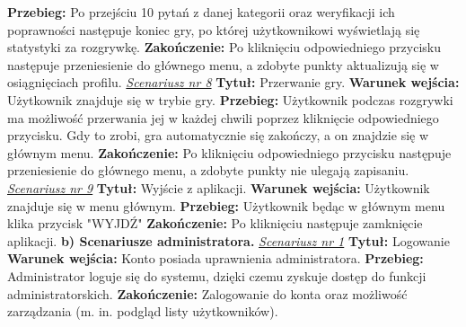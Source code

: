 \newline \textbf{Przebieg:} Po przejściu 10 pytań z danej kategorii oraz weryfikacji ich poprawności następuje koniec gry, po której użytkownikowi wyświetlają się statystyki za rozgrywkę.
\newline \textbf{Zakończenie:} Po kliknięciu odpowiedniego przycisku następuje przeniesienie do głównego menu, a zdobyte punkty aktualizują się w osiągnięciach profilu.  
\newline\newline \textit{\underline{Scenariusz nr 8}}
\newline \textbf{Tytuł:} Przerwanie gry.
\newline \textbf{Warunek wejścia:} Użytkownik znajduje się w trybie gry.
\newline \textbf{Przebieg:} Użytkownik podczas rozgrywki ma możliwość przerwania jej w każdej chwili poprzez kliknięcie odpowiedniego przycisku. Gdy to zrobi, gra automatycznie się zakończy, a on znajdzie się w głównym menu. 
\newline \textbf{Zakończenie:} Po kliknięciu odpowiedniego przycisku następuje przeniesienie do głównego menu, a zdobyte punkty nie ulegają zapisaniu. 
\newline\newline \textit{\underline{Scenariusz nr 9}}
\newline \textbf{Tytuł:} Wyjście z aplikacji.
\newline \textbf{Warunek wejścia:} Użytkownik znajduje się w menu głównym.
\newline \textbf{Przebieg:} Użytkownik będąc w głównym menu klika przycisk "WYJDŹ"
\newline \textbf{Zakończenie:} Po kliknięciu następuje zamknięcie aplikacji.
\newline\newline \textbf{b) Scenariusze administratora.}
\newline \textit{\underline{Scenariusz nr 1}}
\newline \textbf{Tytuł:} Logowanie
\newline \textbf{Warunek wejścia:} Konto posiada uprawnienia administratora.
\newline \textbf{Przebieg:} Administrator loguje się do systemu, dzięki czemu zyskuje dostęp do funkcji administratorskich.
\newline \textbf{Zakończenie:} Zalogowanie do konta oraz możliwość zarządzania (m. in. podgląd listy użytkowników).

